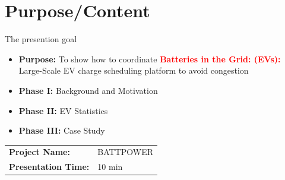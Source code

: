 \documentclass{beamer}
\begin{document}
\section{Purpose/Content}
\begin{frame}{The presention goal}
\begin{itemize}
\item \textbf{Purpose:} To show how to coordinate \textcolor{red}{\textbf{Batteries in the Grid: (EVs):}} Large-Scale EV charge scheduling platform to avoid congestion 
\item \textbf{Phase I:} Background and Motivation
\item \textbf{Phase II:} EV Statistics
\item \textbf{Phase III:} Case Study
\end{itemize}
\begin{center}
\begin{tabular}{|l l|} 
\hline
\rowcolor{Gray} \textbf{Project Name:} &BATTPOWER \\
\textbf{Presentation Time:}& 10 min \\
\hline
\end{tabular}
\end{center}
\end{frame}

\begin{frame}[plain]

\end{frame}
\end{document}

